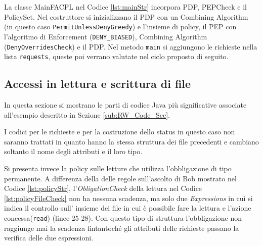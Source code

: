 La classe MainFACPL nel Codice \ref{lst:mainStr} incorpora \ac{PDP}, PEPCheck e il PolicySet. Nel costruttore si inizializzano
il \ac{PDP} con un Combining Algorithm (in questo caso \texttt{PermitUnlessDenyGreedy}) e l'insieme di policy, il PEP con l'algoritmo di
Enforcement (\texttt{DENY\_BIASED}), Combining Algorithm (\texttt{DenyOverridesCheck}) e il \ac{PDP}.
Nel metodo \texttt{main} si aggiungono le richieste nella lista \texttt{requests}, queste poi verrano
valutate nel ciclo proposto di seguito.

\subsection{Accessi in lettura e scrittura di file}
\label{sub:EsAccesJava}
In questa sezione si mostrano le parti di codice Java più significative associate all'esempio
descritto in Sezione \ref{sub:RW_Code_Sec}.\par
\vspace{2mm}
I codici per le richieste e per la costruzione dello status in questo caso non saranno trattati
in quanto hanno la stessa struttura dei file precedenti e cambiano soltanto il nome degli attributi e il loro tipo.\par
Si presenta invece la policy sulle letture che utilizza l'obbligazione di tipo permanente. A differenza della
delle regole sull'ascolto di Bob mostrato nel Codice \ref{lst:policyStr}, l'\emph{ObligationCheck} della lettura nel Codice
\ref{lst:policyFileCheck} non ha nessuna scadenza, ma solo due \emph{Expressions} in cui si indica il controllo sull'
insieme dei file in cui è possibile fare la lettura e l'azione concessa(\texttt{read}) (linee 25-28). Con questo tipo di struttura
l'obbligazione non raggiunge mai la scadenza fintantoché gli attributi delle richieste passano la verifica delle due espressioni.
\clearpage
{}

